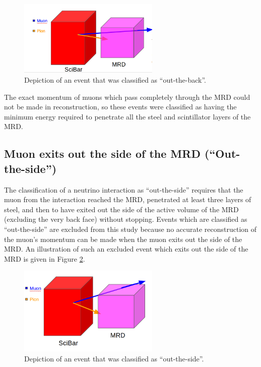 \documentclass[11pt]{article}
\begin{document}
\begin{figure}[H]
\centering
\includegraphics[width=0.6\textwidth]{EventClassifications/NotStopped.png}
\caption{Depiction of an event that was classified as ``out-the-back''.}
\label{fig:NotStoppedEvent}
\end{figure}

The exact momentum of muons which pass completely through the MRD could not be made in reconstruction, so these events were classified as having the minimum energy required to penetrate all the steel and scintillator layers of the MRD.

\subsection{Muon exits out the side of the MRD (``Out-the-side'')}
\label{sub:outside}
The classification of a neutrino interaction as ``out-the-side'' requires that the muon from the interaction reached the MRD, penetrated at least three layers of steel, and then to have exited out the side of the active volume of the MRD (excluding the very back face) without stopping. Events which are classified as ``out-the-side'' are excluded from this study because no accurate reconstruction of the muon's momentum can be made when the muon exits out the side of the MRD. An illustration of such an excluded event which exits out the side of the MRD is given in Figure \ref*{fig:OutTheSideEvent}.


\begin{figure}[H]
\centering
\includegraphics[width=0.6\textwidth]{EventClassifications/OutSide.png}
\caption{Depiction of an event that was classified as ``out-the-side''.}
\label{fig:OutTheSideEvent}
\end{figure}
\end{document}
